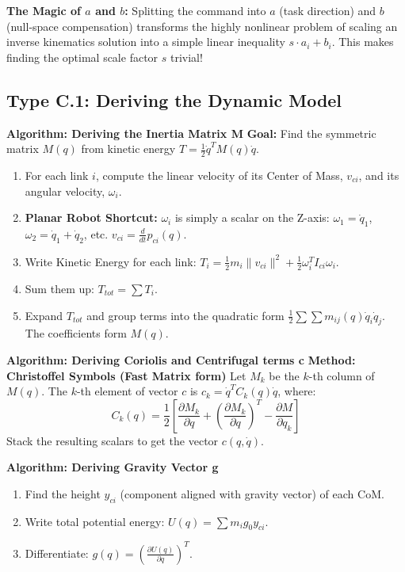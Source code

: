 \documentclass[11pt,a4paper]{article}
\begin{document}
\begin{examtip}
\textbf{The Magic of $a$ and $b$:} Splitting the command into $a$ (task direction) and $b$ (null-space compensation) transforms the highly nonlinear problem of scaling an inverse kinematics solution into a simple linear inequality $s \cdot a_i + b_i$. This makes finding the optimal scale factor $s$ trivial!
\end{examtip}

\subsection{Type C.1: Deriving the Dynamic Model}

 \textbf{Algorithm: Deriving the Inertia Matrix M}
\textbf{Goal:} Find the symmetric matrix $M(q)$ from kinetic energy $T = \frac{1}{2}\dot{q}^T M(q) \dot{q}$.
\begin{enumerate}
    \item For each link $i$, compute the linear velocity of its Center of Mass, $v_{ci}$, and its angular velocity, $\omega_i$.
    \item \textbf{Planar Robot Shortcut:} $\omega_i$ is simply a scalar on the Z-axis: $\omega_1 = \dot{q}_1$, $\omega_2 = \dot{q}_1 + \dot{q}_2$, etc. $v_{ci} = \frac{d}{dt} p_{ci}(q)$.
    \item Write Kinetic Energy for each link: $T_i = \frac{1}{2}m_i \|v_{ci}\|^2 + \frac{1}{2}\omega_i^T I_{ci} \omega_i$.
    \item Sum them up: $T_{tot} = \sum T_i$.
    \item Expand $T_{tot}$ and group terms into the quadratic form $\frac{1}{2} \sum \sum m_{ij}(q)\dot{q}_i \dot{q}_j$. The coefficients form $M(q)$.
\end{enumerate}


 \textbf{Algorithm: Deriving Coriolis and Centrifugal terms c}
\textbf{Method: Christoffel Symbols (Fast Matrix form)}
Let $M_k$ be the $k$-th column of $M(q)$. The $k$-th element of vector $c$ is $c_k = \dot{q}^T C_k(q) \dot{q}$, where:
\begin{equation}
    C_k(q) = \frac{1}{2} \left[ \frac{\partial M_k}{\partial q} + \left(\frac{\partial M_k}{\partial q}\right)^T - \frac{\partial M}{\partial q_k} \right]
\end{equation}
Stack the resulting scalars to get the vector $c(q, \dot{q})$.
 \

 \textbf{Algorithm: Deriving Gravity Vector g}
\begin{enumerate}
    \item Find the height $y_{ci}$ (component aligned with gravity vector) of each CoM.
    \item Write total potential energy: $U(q) = \sum m_i g_0 y_{ci}$.
    \item Differentiate: $g(q) = \left( \frac{\partial U(q)}{\partial q} \right)^T$.
\end{enumerate}
\end{document}
